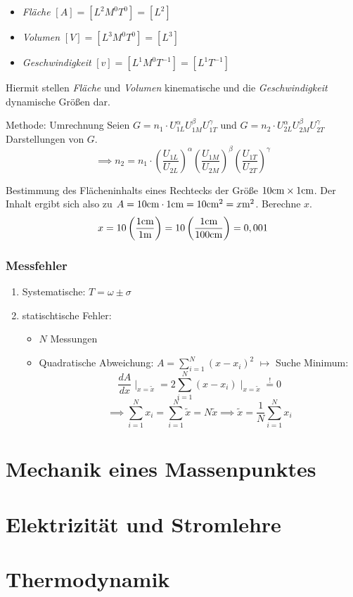 \documentclass[a4paper,10pt]{scrartcl}
\begin{document}
\begin{ex}

\begin{itemize}
 \item \emph{Fläche} $[A]=[L^2 M^0 T^0]=[L^2]$
 \item \emph{Volumen} $[V]=[L^3M^0T^0]=[L^3]$
 \item \emph{Geschwindigkeit} $[v]=[L^1M^0T^{-1}]=[L^1 T^{-1}]$
\end{itemize}
Hiermit stellen \emph{Fläche} und \emph{Volumen} kinematische und die \emph{Geschwindigkeit} dynamische Größen dar.
\end{ex}
\newpage  
\begin{seg}{Methode: Umrechnung}
 Seien $G=n_1\cdot U_{1L}^\alpha U_{1M}^\beta U_{1T}^\gamma$ und $G=n_2\cdot U_{2L}^\alpha U_{2M}^\beta U_{2T}^\gamma$ Darstellungen von $G$.
 \[
  \implies n_2=n_1 \cdot \left ( \frac{U_{1L}}{U_{2L}} \right )^\alpha \left ( \frac{U_{1M}}{U_{2M}} \right )^\beta \left ( \frac{U_{1T}}{U_{2T}} \right )^\gamma
 \]
\end{seg}
\begin{ex}
 Bestimmung des Flächeninhalts eines Rechtecks der Größe $10 \text{cm} \times 1\text{cm}$.  Der Inhalt ergibt sich also zu $A=10\text{cm}\cdot 1 \text{cm}=10\text{cm}^2=x\text{m}^2$.  Berechne $x$.
\[
 x=10 \left ( \frac{1 \text{cm}}{1 \text{m}} \right ) = 10 \left ( \frac{1 \text{cm}}{100 \text{cm}} \right )=0,001
\]

\end{ex}

\subsubsection{Messfehler}
\begin{enumerate}
 \item Systematische: $T=\omega \pm \sigma$
 \item statischtische Fehler:\\
 \begin{itemize}
  \item $N$ Messungen
  \item Quadratische Abweichung: $A=\sum_{i=1}^{N}(x-x_i)^2$
\subitem $\mapsto$ Suche Minimum:
\[
 \frac{dA}{dx} \mid_{x=\tilde x}=2 \sum_{i=1}^N(x-x_i) \mid_{x=\tilde x}\stackrel{!}{=}0
\]
\[
  \implies \sum_{i=1}^N x_i=\sum_{i=1}^N \tilde x=N\tilde x \implies \tilde x=\frac{1}{N}  \sum_{i=1}^N x_i
\]


 \end{itemize}

\end{enumerate}

\section{Mechanik eines Massenpunktes}

\section{Elektrizität und Stromlehre}

\section{Thermodynamik}
\end{document}
